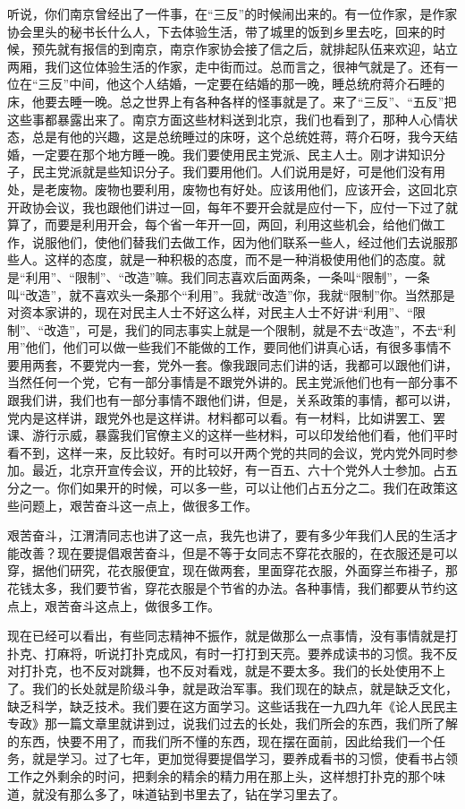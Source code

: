 听说，你们南京曾经出了一件事，在“三反”的时候闹出来的。有一位作家，是作家协会里头的秘书长什么人，下去体验生活，带了城里的饭到乡里去吃，回来的时候，预先就有报信的到南京，南京作家协会接了信之后，就排起队伍来欢迎，站立两厢，我们这位体验生活的作家，走中街而过。总而言之，很神气就是了。还有一位在“三反”中间，他这个人结婚，一定要在结婚的那一晚，睡总统府蒋介石睡的床，他要去睡一晚。总之世界上有各种各样的怪事就是了。来了“三反”、“五反”把这些事都暴露出来了。南京方面这些材料送到北京，我们也看到了，那种人心情状态，总是有他的兴趣，这是总统睡过的床呀，这个总统姓蒋，蒋介石呀，我今天结婚，一定要在那个地方睡一晚。我们要使用民主党派、民主人士。刚才讲知识分子，民主党派就是些知识分子。我们要用他们。人们说用是好，可是他们没有用处，是老废物。废物也要利用，废物也有好处。应该用他们，应该开会，这回北京开政协会议，我也跟他们讲过一回，每年不要开会就是应付一下，应付一下过了就算了，而要是利用开会，每个省一年开一回，两回，利用这些机会，给他们做工作，说服他们，使他们替我们去做工作，因为他们联系一些人，经过他们去说服那些人。这样的态度，就是一种积极的态度，而不是一种消极使用他们的态度。就是“利用”、“限制”、“改造”嘛。我们同志喜欢后面两条，一条叫“限制”，一条叫“改造”，就不喜欢头一条那个“利用”。我就“改造”你，我就“限制”你。当然那是对资本家讲的，现在对民主人士不好这么样，对民主人士不好讲“利用”、“限制”、“改造”，可是，我们的同志事实上就是一个限制，就是不去“改造”，不去“利用”他们，他们可以做一些我们不能做的工作，要同他们讲真心话，有很多事情不要用两套，不要党内一套，党外一套。像我跟同志们讲的话，我都可以跟他们讲，当然任何一个党，它有一部分事情是不跟党外讲的。民主党派他们也有一部分事不跟我们讲，我们也有一部分事情不跟他们讲，但是，关系政策的事情，都可以讲，党内是这样讲，跟党外也是这样讲。材料都可以看。有一材料，比如讲罢工、罢课、游行示威，暴露我们官僚主义的这样一些材料，可以印发给他们看，他们平时看不到，这样一来，反比较好。有时可以开两个党的共同的会议，党内党外同时参加。最近，北京开宣传会议，开的比较好，有一百五、六十个党外人士参加。占五分之一。你们如果开的时候，可以多一些，可以让他们占五分之二。我们在政策这些问题上，艰苦奋斗这一点上，做很多工作。

艰苦奋斗，江渭清同志也讲了这一点，我先也讲了，要有多少年我们人民的生活才能改善？现在要提倡艰苦奋斗，但是不等于女同志不穿花衣服的，在衣服还是可以穿，据他们研究，花衣服便宜，现在做两套，里面穿花衣服，外面穿兰布褂子，那花钱太多，我们要节省，穿花衣服是个节省的办法。各种事情，我们都要从节约这点上，艰苦奋斗这点上，做很多工作。

现在已经可以看出，有些同志精神不振作，就是做那么一点事情，没有事情就是打扑克、打麻将，听说打扑克成风，有时一打打到天亮。要养成读书的习惯。我不反对打扑克，也不反对跳舞，也不反对看戏，就是不要太多。我们的长处使用不上了。我们的长处就是阶级斗争，就是政治军事。我们现在的缺点，就是缺乏文化，缺乏科学，缺乏技术。我们要在这方面学习。这些话我在一九四九年《论人民民主专政》那一篇文章里就讲到过，说我们过去的长处，我们所会的东西，我们所了解的东西，快要不用了，而我们所不懂的东西，现在摆在面前，因此给我们一个任务，就是学习。过了七年，更加觉得要提倡学习，要养成看书的习惯，使看书占领工作之外剩余的时问，把剩余的精余的精力用在那上头，这样想打扑克的那个味道，就没有那么多了，味道钻到书里去了，钻在学习里去了。

